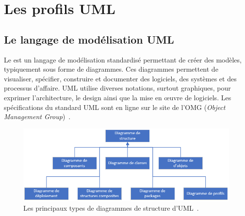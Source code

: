 \chapter{Les profils UML}
\label{chap.profils-UML}


\section{Le langage de modélisation UML}

Le  est un langage de modélisation standardisé permettant de créer des mod\`eles, typiquement sous forme de diagrammes.
Ces diagrammes permettent de visualiser, spécifier, construire et documenter des logiciels, des systèmes et des processus d'affaire.
UML utilise diverses notations,  surtout graphiques, pour exprimer l'architecture, le design ainsi que la mise en \oe{}uvre de logiciels.
Les spécifications du standard UML sont en ligne sur le site de l'OMG (\emph{Object Management Group})~\cite{OMG_UML}.




 
\begin{figure}
    \centering
    \includegraphics[width=12cm]{10_img/chap4/structure.PNG}
    \caption{Les principaux types de diagrammes de structure d'UML~\cite{OMG_UML}.}
    \label{fig.uml_struc}
\end{figure}

